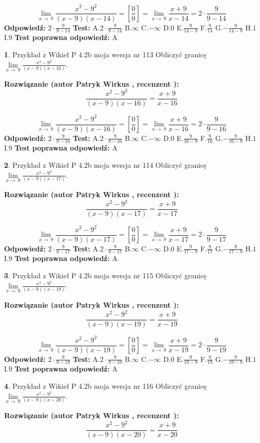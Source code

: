 \documentclass[12pt, a4paper]{article}
\theoremstyle{definition} %
\newtheorem{zad}{}
\newcommand{\zadStart}[1]{\begin{zad}#1\newline}
\newcommand{\zadStop}{\end{zad}}
\newcommand{\rozwStart}[2]{\noindent \textbf{Rozwiązanie (autor #1 , recenzent #2): }\newline}
\newcommand{\rozwStop}{\newline}
\newcommand{\odpStart}{\noindent \textbf{Odpowiedź:}\newline}
\newcommand{\odpStop}{\newline}
\newcommand{\testStart}{\noindent \textbf{Test:}\newline}
\newcommand{\testStop}{\newline}
\newcommand{\kluczStart}{\noindent \textbf{Test poprawna odpowiedź:}\newline}
\newcommand{\kluczStop}{\newline}
\begin{document}
$$\lim\limits_{x\to\ 9}\frac{x^{2}-9^{2}}{(x-9)(x-14)}=[\frac{0}{0}]=\lim\limits_{x\to\ 9}\frac{x+9}{x-14}=2 \cdot \frac{9}{9-14}$$
\rozwStop
\odpStart
$2 \cdot \frac{9}{9-14}$
\odpStop
\testStart
A.$2 \cdot \frac{9}{9-14}$
B.$\infty$
C.$-\infty$
D.$0$
E.$\frac{9}{14-9}$
F.$\frac{9}{14}$
G.$-\frac{9}{14-9}$
H.$1$
I.$9$
\testStop
\kluczStart
A
\kluczStop



\zadStart{Przykład z Wikieł P 4.2b moja wersja nr 113}
Obliczyć granicę $\lim\limits_{x\to\ 9}\frac{x^{2}-9^{2}}{(x-9)(x-16)}$.
\zadStop
\rozwStart{Patryk Wirkus}{}
$$\frac{x^{2}-9^{2}}{(x-9)(x-16)}=\frac{x+9}{x-16}$$

$$\lim\limits_{x\to\ 9}\frac{x^{2}-9^{2}}{(x-9)(x-16)}=[\frac{0}{0}]=\lim\limits_{x\to\ 9}\frac{x+9}{x-16}=2 \cdot \frac{9}{9-16}$$
\rozwStop
\odpStart
$2 \cdot \frac{9}{9-16}$
\odpStop
\testStart
A.$2 \cdot \frac{9}{9-16}$
B.$\infty$
C.$-\infty$
D.$0$
E.$\frac{9}{16-9}$
F.$\frac{9}{16}$
G.$-\frac{9}{16-9}$
H.$1$
I.$9$
\testStop
\kluczStart
A
\kluczStop



\zadStart{Przykład z Wikieł P 4.2b moja wersja nr 114}
Obliczyć granicę $\lim\limits_{x\to\ 9}\frac{x^{2}-9^{2}}{(x-9)(x-17)}$.
\zadStop
\rozwStart{Patryk Wirkus}{}
$$\frac{x^{2}-9^{2}}{(x-9)(x-17)}=\frac{x+9}{x-17}$$

$$\lim\limits_{x\to\ 9}\frac{x^{2}-9^{2}}{(x-9)(x-17)}=[\frac{0}{0}]=\lim\limits_{x\to\ 9}\frac{x+9}{x-17}=2 \cdot \frac{9}{9-17}$$
\rozwStop
\odpStart
$2 \cdot \frac{9}{9-17}$
\odpStop
\testStart
A.$2 \cdot \frac{9}{9-17}$
B.$\infty$
C.$-\infty$
D.$0$
E.$\frac{9}{17-9}$
F.$\frac{9}{17}$
G.$-\frac{9}{17-9}$
H.$1$
I.$9$
\testStop
\kluczStart
A
\kluczStop



\zadStart{Przykład z Wikieł P 4.2b moja wersja nr 115}
Obliczyć granicę $\lim\limits_{x\to\ 9}\frac{x^{2}-9^{2}}{(x-9)(x-19)}$.
\zadStop
\rozwStart{Patryk Wirkus}{}
$$\frac{x^{2}-9^{2}}{(x-9)(x-19)}=\frac{x+9}{x-19}$$

$$\lim\limits_{x\to\ 9}\frac{x^{2}-9^{2}}{(x-9)(x-19)}=[\frac{0}{0}]=\lim\limits_{x\to\ 9}\frac{x+9}{x-19}=2 \cdot \frac{9}{9-19}$$
\rozwStop
\odpStart
$2 \cdot \frac{9}{9-19}$
\odpStop
\testStart
A.$2 \cdot \frac{9}{9-19}$
B.$\infty$
C.$-\infty$
D.$0$
E.$\frac{9}{19-9}$
F.$\frac{9}{19}$
G.$-\frac{9}{19-9}$
H.$1$
I.$9$
\testStop
\kluczStart
A
\kluczStop



\zadStart{Przykład z Wikieł P 4.2b moja wersja nr 116}
Obliczyć granicę $\lim\limits_{x\to\ 9}\frac{x^{2}-9^{2}}{(x-9)(x-20)}$.
\zadStop
\rozwStart{Patryk Wirkus}{}
$$\frac{x^{2}-9^{2}}{(x-9)(x-20)}=\frac{x+9}{x-20}$$
\end{document}
